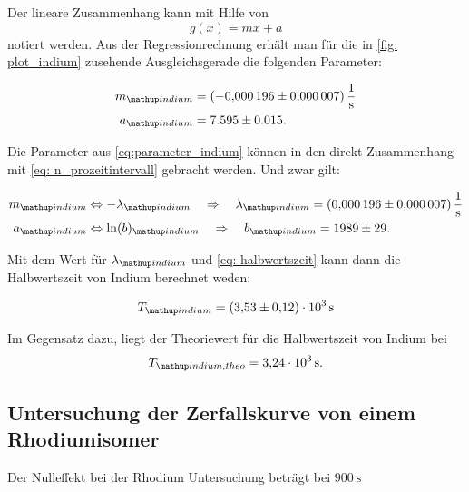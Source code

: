 Der lineare Zusammenhang kann mit Hilfe von
\begin{equation*}
  g(x)=mx+a
\end{equation*}
notiert werden.
Aus der Regressionrechnung erhält man für die in \ref{fig: plot_indium} zusehende
Ausgleichsgerade die folgenden Parameter:

\begin{align}
  \label{eq:parameter_indium}
  \begin{aligned}
    m\ua{indium}&=\SI{-0.000196\pm0.000007}{\per\second}\\
    a\ua{indium}&=7.595\pm0.015.
  \end{aligned}
\end{align}

Die Parameter aus \eqref{eq:parameter_indium} können in den direkt Zusammenhang mit
\eqref{eq: n_prozeitintervall} gebracht werden. Und zwar gilt:

\begin{align}
  \label{eq:parameter_indium}
  \begin{aligned}
    m\ua{indium}&\Leftrightarrow -\lambda\ua{indium} \quad \Rightarrow \quad \lambda\ua{indium}=\SI{0.000196\pm0.000007}{\per\second}\\
    a\ua{indium}&\Leftrightarrow \ln(b)\ua{indium} \quad \Rightarrow \quad b\ua{indium} =1989\pm 29.
  \end{aligned}
\end{align}

Mit dem Wert für $\lambda\ua{indium}$ und \eqref{eq: halbwertszeit} kann dann die Halbwertszeit von Indium
berechnet weden:

\begin{equation}
  \label{eq:halbwertzeit_indium}
  T\ua{indium}=\SI{3.53\pm0.12 e+3}{\second}
\end{equation}

Im Gegensatz dazu, liegt der Theoriewert für die Halbwertszeit von Indium\cite{indium_halb} bei
\begin{equation}
  \label{eq:halbwertzeit_indium_theo}
  T\ua{indium,theo}=\SI{3.24 e+3}{\second}.
\end{equation}

\subsection{Untersuchung der Zerfallskurve von einem Rhodiumisomer}

Der Nulleffekt bei der Rhodium Untersuchung beträgt bei $\SI{900}{\second}$

